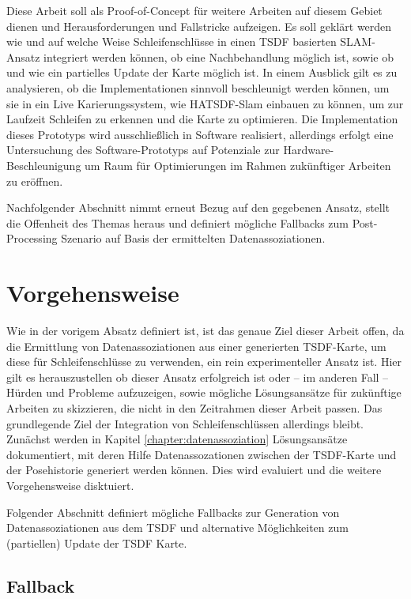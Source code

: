 Diese Arbeit soll als Proof-of-Concept für weitere Arbeiten auf diesem Gebiet dienen und Herausforderungen und Fallstricke aufzeigen. Es soll geklärt werden wie und auf welche Weise Schleifenschlüsse in einen TSDF basierten SLAM-Ansatz integriert werden können, ob eine Nachbehandlung möglich ist, sowie ob und wie ein partielles Update der Karte möglich ist.
In einem Ausblick gilt es zu analysieren, ob die Implementationen sinnvoll beschleunigt werden können, um sie in ein Live Karierungssystem, wie HATSDF-Slam einbauen zu können, um zur Laufzeit Schleifen zu erkennen und die Karte zu optimieren.
Die Implementation dieses Prototyps wird ausschließlich in Software realisiert, allerdings erfolgt eine Untersuchung des Software-Prototyps auf Potenziale zur Hardware-Beschleunigung um Raum für Optimierungen im Rahmen zukünftiger Arbeiten zu eröffnen.

Nachfolgender Abschnitt nimmt erneut Bezug auf den gegebenen Ansatz, stellt die Offenheit des Themas heraus und definiert mögliche Fallbacks zum Post-Processing Szenario auf Basis der ermittelten Datenassoziationen.

\section{Vorgehensweise}
\label{section:herangehensweise}

Wie in der vorigem Absatz definiert ist, ist das genaue Ziel dieser Arbeit offen, da die Ermittlung von Datenassoziationen aus einer generierten TSDF-Karte, um diese für Schleifenschlüsse zu verwenden, ein rein experimenteller Ansatz ist.
Hier gilt es herauszustellen ob dieser Ansatz erfolgreich ist oder -- im anderen Fall -- Hürden und Probleme aufzuzeigen, sowie mögliche Lösungsansätze für zukünftige Arbeiten zu skizzieren, die nicht in den Zeitrahmen dieser Arbeit passen.
Das grundlegende Ziel der Integration von Schleifenschlüssen allerdings bleibt.
Zunächst werden in Kapitel \ref{chapter:datenassoziation} Lösungsansätze dokumentiert, mit deren Hilfe Datenassozationen zwischen der TSDF-Karte und der Posehistorie generiert werden können. Dies wird evaluiert und die weitere Vorgehensweise disktuiert.

Folgender Abschnitt definiert mögliche Fallbacks zur Generation von Datenassoziationen aus dem TSDF und alternative Möglichkeiten zum (partiellen) Update der TSDF Karte.

\subsection{Fallback}
\label{section:fallback}

